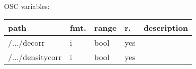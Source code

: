 \begin{snugshade}
{\footnotesize
\label{osctab:receivermodbasespeaker}
OSC variables:
\nopagebreak

\begin{tabularx}{\textwidth}{llllX}
\hline
path & fmt. & range & r. & description\\
\hline
/.../decorr & i & bool & yes & \\
/.../densitycorr & i & bool & yes & \\
\hline
\end{tabularx}
}
\end{snugshade}
